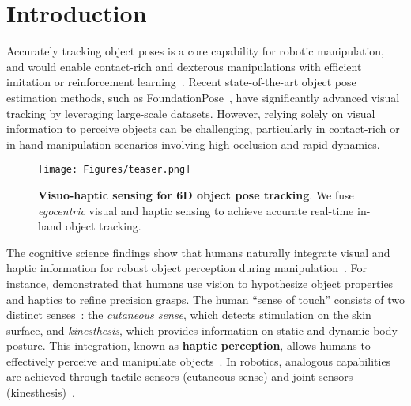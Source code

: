 \documentclass[11pt, a4paper, logo, twocolumn]{brown}
\begin{document}
\section{Introduction}
Accurately tracking object poses is a core capability for robotic manipulation, and would enable contact-rich and dexterous manipulations with efficient imitation or reinforcement learning~\cite{wen_you_2022, li_drop_2024, hsu_spot_2024}.
Recent state-of-the-art object pose estimation methods, such as FoundationPose~\cite{wen_foundationpose_2024}, have significantly advanced visual tracking by leveraging large-scale datasets.
However, relying solely on visual information to perceive objects can be challenging, particularly in contact-rich or in-hand manipulation scenarios involving high occlusion and rapid dynamics.

\begin{figure}[!t]
    \centering
    \texttt{[image: Figures/teaser.png]}
    \caption{
    \textbf{Visuo-haptic sensing for 6D object pose tracking}.
    We fuse \emph{egocentric} visual and haptic sensing to achieve accurate real-time in-hand object tracking.
    }
    \label{fig:teaser}
\end{figure}

The cognitive science findings show that humans naturally integrate visual and haptic information for robust object perception during manipulation~\cite{navarro-guerrero_visuo-haptic_2023, ernst_humans_2002, lacey_chapter_2020}. 
For instance, \citet{gordon_integration_1991} demonstrated that humans use vision to hypothesize object properties and haptics to refine precision grasps.
The human ``sense of touch'' consists of two distinct senses~\cite{loomis_tactual_1986, dahiya_tactile_2010}: the \emph{cutaneous sense}, which detects stimulation on the skin surface, and \emph{kinesthesis}, which provides information on static and dynamic body posture.
This integration, known as \textbf{haptic perception}, allows humans to effectively perceive and manipulate objects~\cite{lacey_chapter_2020}. 
In robotics, analogous capabilities are achieved through tactile sensors (cutaneous sense) and joint sensors (kinesthesis)~\cite{navarro-guerrero_visuo-haptic_2023}. 
\end{document}
